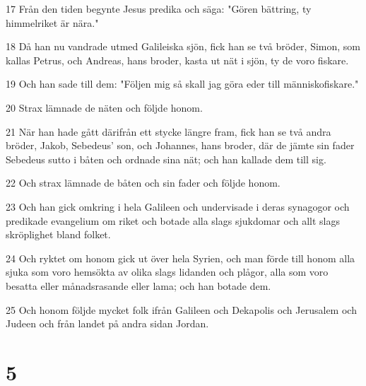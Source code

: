 \par 17 Från den tiden begynte Jesus predika och säga: "Gören bättring, ty himmelriket är nära."
\par 18 Då han nu vandrade utmed Galileiska sjön, fick han se två bröder, Simon, som kallas Petrus, och Andreas, hans broder, kasta ut nät i sjön, ty de voro fiskare.
\par 19 Och han sade till dem: "Följen mig så skall jag göra eder till människofiskare."
\par 20 Strax lämnade de näten och följde honom.
\par 21 När han hade gått därifrån ett stycke längre fram, fick han se två andra bröder, Jakob, Sebedeus' son, och Johannes, hans broder, där de jämte sin fader Sebedeus sutto i båten och ordnade sina nät; och han kallade dem till sig.
\par 22 Och strax lämnade de båten och sin fader och följde honom.
\par 23 Och han gick omkring i hela Galileen och undervisade i deras synagogor och predikade evangelium om riket och botade alla slags sjukdomar och allt slags skröplighet bland folket.
\par 24 Och ryktet om honom gick ut över hela Syrien, och man förde till honom alla sjuka som voro hemsökta av olika slags lidanden och plågor, alla som voro besatta eller månadsrasande eller lama; och han botade dem.
\par 25 Och honom följde mycket folk ifrån Galileen och Dekapolis och Jerusalem och Judeen och från landet på andra sidan Jordan.

\chapter{5}

